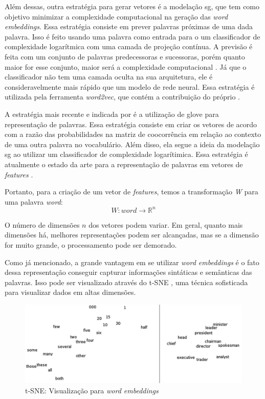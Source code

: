 Além dessas, outra estratégia para gerar vetores é a modelação \ac{sg}, que tem como objetivo minimizar a complexidade computacional na geração das \textit{word embeddings}. Essa estratégia consiste em prever palavras próximas de uma dada palavra. Isso é feito usando uma palavra como entrada para o um classificador de complexidade logarítmica com uma camada de projeção contínua. A previsão é feita com um conjunto de palavras predecessoras e sucessoras, porém quanto maior for esse conjunto, maior será a complexidade computacional \cite{mikolov2013efficient}. Já que o classificador não tem uma camada oculta na sua arquitetura, ele é consideravelmente mais rápido que um modelo de rede neural. Essa estratégia é utilizada pela ferramenta \textit{word2vec}, que contém a contribuição do próprio .

A estratégia mais recente e indicada por  é a utilização de \ac{glove} para representação de palavras. Essa estratégia consiste em criar os vetores de acordo com a razão das probabilidades na matriz de coocorrência em relação ao contexto de uma outra palavra no vocabulário. Além disso, ela segue a ideia da modelação \ac{sg} ao utilizar um classificador de complexidade logarítimica. Essa estratégia é atualmente o estado da arte para a representação de palavras em vetores de \textit{features} \cite{pennington2014glove}. 

Portanto, para a criação de um vetor de \textit{features}, temos a transformação \textit{W} para uma palavra \textit{word}:
\begin{equation}
W:word \to \mathbb{R}^n \nonumber
\end{equation}

O número de dimensões $n$ dos vetores podem variar. Em geral, quanto mais dimensões há, melhores representações podem ser alcançadas, mas se a dimensão for muito grande, o processamento pode ser demorado.

Como já mencionado, a grande vantagem em se utilizar \textit{word embeddings} é o fato dessa representação conseguir capturar informações sintáticas e semânticas das palavras. Isso pode ser visualizado através do t-SNE \cite{van2008visualizing}, uma técnica sofisticada para visualizar dados em altas dimensões.

\begin{figure}[htb]
  \caption{t-SNE: Visualização para \textit{word embeddings}}\label{fig:wordtsne}
  \begin{center}
      \includegraphics[scale=0.25]{img/Turian-WordTSNE}
  \end{center}
\end{figure}

